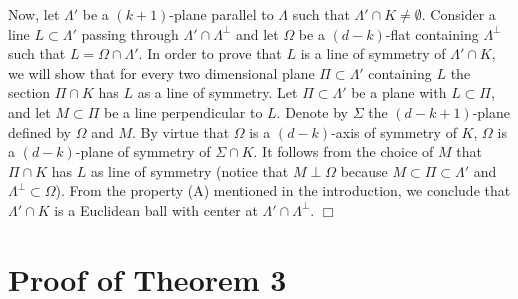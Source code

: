 \documentclass[12pt,thmsa]{amsart}
\begin{document}
Now, let $\Lambda'$ be a $(k+1)$-plane parallel to $\Lambda$ such that $\Lambda' \cap K\not=\emptyset$. %
Consider a line $L\subset \Lambda'$  passing through 
$\Lambda' \cap \Lambda^{\perp}$ and let $\Omega$ be a $(d-k)$-flat containing $\Lambda^{\perp}$ such that $L=\Omega \cap \Lambda'$. In order to prove that $L$ is a line of symmetry of $\Lambda' \cap K$,  we will show that for every two dimensional plane $\Pi\subset \Lambda'$ containing $L$ the section $\Pi \cap K$ has $L$ as a line of symmetry. Let $\Pi \subset \Lambda'$ be a plane with $L\subset \Pi$, and let $M\subset \Pi$ be a line perpendicular to $L$. Denote by $\Sigma$ the $(d-k+1)$-plane defined by $\Omega$ and $M$. By virtue that $\Omega$ is a $(d-k)$-axis of symmetry of $K$,    
$\Omega$ is a $(d-k)$-plane of symmetry of $\Sigma \cap K$.
It follows from the choice of $M$ that $\Pi \cap K$ has $L$ as line of symmetry (notice that $M\perp \Omega$ because $M\subset \Pi \subset \Lambda'$ and $\Lambda^{\perp}\subset \Omega$). From the property (A) mentioned in the introduction, we conclude that $\Lambda' \cap K$ is a Euclidean ball with center at $\Lambda' \cap \Lambda^{\perp}$.   $\Box$ 

\section{Proof of Theorem 3}
\end{document}
